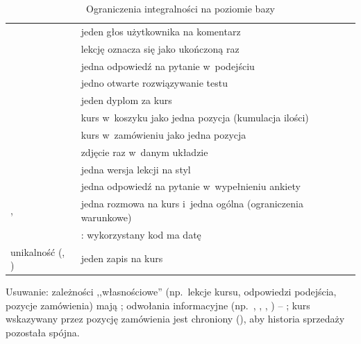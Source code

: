 \begin{table}[H]
\centering\small
\caption{Ograniczenia integralności na poziomie bazy}
\begin{tabularx}{\linewidth}{@{}P{4.6cm}L@{}}
\toprule
{} &  \\
\midrule
{} & jeden głos użytkownika na komentarz \\
 & lekcję oznacza się jako ukończoną raz \\
 & jedna odpowiedź na pytanie w~podejściu \\
 & jedno otwarte rozwiązywanie testu \\
 & jeden dyplom za kurs \\
 & kurs w~koszyku jako jedna pozycja (kumulacja ilości) \\
 & kurs w~zamówieniu jako jedna pozycja \\
 & zdjęcie raz w~danym układzie \\
 & jedna wersja lekcji na styl \\
 & jedna odpowiedź na pytanie w~wypełnieniu ankiety \\
,  & jedna rozmowa na kurs i~jedna ogólna (ograniczenia warunkowe) \\
 & : wykorzystany kod ma datę \\
unikalność  (, ) & jeden zapis na kurs \\
\bottomrule
\end{tabularx}
\end{table}

Usuwanie: zależności ,,własnościowe'' (np.\ lekcje kursu, odpowiedzi podejścia, pozycje
zamówienia) mają ; odwołania informacyjne (np.\ ,
, , ) -- ; kurs
wskazywany przez pozycję zamówienia jest chroniony (), aby historia sprzedaży
pozostała spójna.
